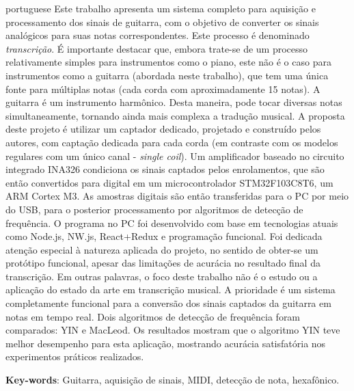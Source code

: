 \begin{summary}[Resumo]
 \begin{otherlanguage*}{portuguese}
    Este trabalho apresenta um sistema completo para aquisição e processamento dos sinais de guitarra,
    com o objetivo de converter os sinais analógicos para suas notas correspondentes. Este processo é denominado \emph{transcrição}. 
    É importante destacar que, embora trate-se de um processo relativamente simples para instrumentos
    como o piano, este não é o caso para instrumentos como a guitarra (abordada neste trabalho), que tem
    uma única fonte para múltiplas notas (cada corda com aproximadamente 15 notas). A guitarra é um instrumento
    harmônico. Desta maneira, pode tocar diversas notas simultaneamente, tornando ainda mais complexa a tradução
    musical. A proposta deste projeto é utilizar um captador dedicado, projetado e construído pelos autores,
    com captação dedicada para cada corda (em contraste com os modelos regulares com um único canal - \emph{single coil}).
    Um amplificador baseado no circuito integrado INA326 condiciona os sinais captados pelos enrolamentos, que são
    então convertidos para digital em um microcontrolador STM32F103C8T6,
    um ARM Cortex M3. As amostras digitais são então transferidas para o PC por meio do USB, para o posterior processamento
    por algoritmos de detecção de frequência.  O programa no PC foi desenvolvido com base em tecnologias atuais como Node.js, NW.js, React+Redux e
    programação funcional. Foi dedicada atenção especial à natureza aplicada do projeto, no sentido de obter-se
    um protótipo funcional, apesar das limitações de acurácia no resultado final da transcrição. Em outras palavras, 
    o foco deste trabalho não é o estudo ou a aplicação do estado da arte em transcrição musical. A prioridade é um sistema completamente funcional
    para a conversão dos sinais captados da guitarra em notas em tempo real. Dois algoritmos de detecção
    de frequência foram comparados: YIN e MacLeod. Os resultados mostram que o algoritmo YIN teve melhor
    desempenho para esta aplicação, mostrando acurácia satisfatória nos experimentos práticos realizados.
  
  
    \textbf{Key-words}: Guitarra, aquisição de sinais, MIDI, detecção de nota, hexafônico.
  \end{otherlanguage*}
\end{summary}

